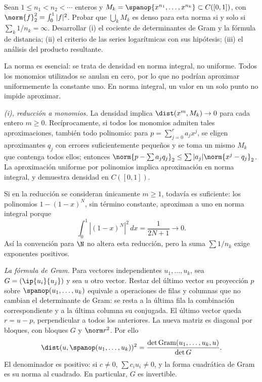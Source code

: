 \begin{ejercicio}
Sean $1\leq n_1<n_2<\cdots$ enteros y $M_k=\spanop\{x^{n_1},\dots,x^{n_k}\}\subset C([0,1])$, con $\norm{f}_2^{2}=\int_0^1|f|^{2}$. Probar que $\bigcup_kM_k$ es denso para esta norma si y solo si $\sum_k1/n_k=\infty$. Desarrollar (i) el cociente de determinantes de Gram y la fórmula de distancia; (ii) el criterio de las series logarítmicas con sus hipótesis; (iii) el análisis del producto resultante.
\end{ejercicio}
\begin{solucion}
La norma es esencial: se trata de densidad en norma integral, no uniforme. Todos los monomios utilizados se anulan en cero, por lo que no podrían aproximar uniformemente la constante uno. En norma integral, un valor en un solo punto no impide aproximar.

\emph{(i), reducción a monomios.} La densidad implica $\dist(x^m,M_k)\to0$ para cada entero $m\geq0$. Recíprocamente, si todos los monomios admiten tales aproximaciones, también todo polinomio: para $p=\sum_{j=0}^{r}a_jx^j$, se eligen aproximantes $q_j$ con errores suficientemente pequeños y se toma un mismo $M_k$ que contenga todos ellos; entonces $\norm{p-\sum a_jq_j}_2\leq\sum|a_j|\norm{x^j-q_j}_2$. La aproximación uniforme por polinomios implica aproximación en norma integral, y demuestra densidad en $C([0,1])$.

Si en la reducción se consideran únicamente $m\geq1$, todavía es suficiente: los polinomios $1-(1-x)^N$, sin término constante, aproximan a uno en norma integral porque
\[
 \int_0^1|(1-x)^N|^{2}\,dx=\frac1{2N+1}\longrightarrow0.
\]
Así la convención para $\N$ no altera esta reducción, pero la suma $\sum1/n_k$ exige exponentes positivos.

\emph{La fórmula de Gram.} Para vectores independientes $u_1,\dots,u_k$, sea $G=(\ip{u_i}{u_j})$ y sea $u$ otro vector. Restar del último vector su proyección $p$ sobre $\spanop(u_1,\dots,u_k)$ equivale a operaciones de filas y columnas que no cambian el determinante de Gram: se resta a la última fila la combinación correspondiente y a la última columna su conjugada. El último vector queda $r=u-p$, perpendicular a todos los anteriores. La nueva matriz es diagonal por bloques, con bloques $G$ y $\norm r^{2}$. Por ello
\[
 \dist(u,\spanop(u_1,\dots,u_k))^{2}
 =\frac{\det\operatorname{Gram}(u_1,\dots,u_k,u)}{\det G}.
\]
El denominador es positivo: si $c\ne0$, $\sum c_iu_i\ne0$, y la forma cuadrática de Gram es su norma al cuadrado. En particular, $G$ es invertible.


\end{solucion}
